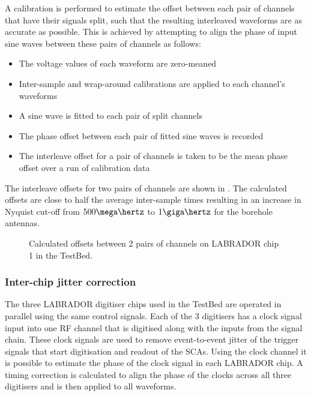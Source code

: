 A calibration is performed to estimate the offset between each pair of channels that have their signals split, such that the resulting interleaved waveforms are as accurate as possible. This is achieved by attempting to align the phase of input sine waves between these pairs of channels as follows:

\begin{itemize}
\item The voltage values of each waveform are zero-meaned
\item Inter-sample and wrap-around calibrations are applied to each channel's waveforms
\item A sine wave is fitted to each pair of split channels
\item The phase offset between each pair of fitted sine waves is recorded
\item The interleave offset for a pair of channels is taken to be the mean phase offset over a run of calibration data
\end{itemize}

The interleave offsets for two pairs of channels are shown in . The calculated offsets are close to half the average inter-sample times resulting in an increase in Nyquist cut-off from $500 \mega\hertz$ to $1\giga\hertz$ for the borehole antennas.

\begin{figure}[htpb]
  \hfill
  \caption{Calculated offsets between 2 pairs of channels on LABRADOR chip 1 in the TestBed.}
  \label{fig:calibration:LABRADOR-Digitiser-Chip:Interleave}
\end{figure}



\subsubsection{Inter-chip jitter correction}
\label{sec:calibration:LABRADOR-Digitiser-Chip:Inter-chip-jitter-correction}

The three LABRADOR digitiser chips used in the TestBed are operated in parallel using the same control signals. Each of the 3 digitisers has a clock signal input into one RF channel that is digitised along with the inputs from the signal chain. These clock signals are used to remove event-to-event jitter of the trigger signals that start digitisation and readout of the SCAs. Using the clock channel it is possible to estimate the phase of the clock signal in each LABRADOR chip. A timing correction is calculated to align the phase of the clocks across all three digitisers and is then applied to all waveforms.

